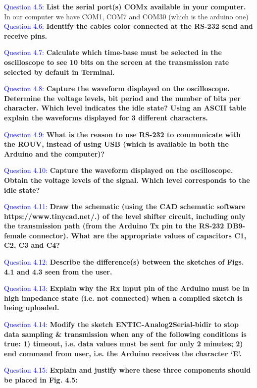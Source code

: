 \documentclass[12pt, a4papre]{article}
\begin{document}
	\textcolor{blue}{Question 4.5:}  \textbf{List the serial port(s) COMx available in your computer. }
		In our computer we have COM1, COM7 and COM30 (which is the arduino one)
	\textcolor{blue}{Question 4.6:}  \textbf{Identify the cables color connected at the RS-232 send and receive pins.}

	\textcolor{blue}{Question 4.7:}  \textbf{Calculate which time-base must be selected in the oscilloscope to see 10 bits on the screen at the transmission rate selected by default in Terminal. }

	\textcolor{blue}{Question 4.8:} \textbf{Capture the waveform displayed on the oscilloscope. Determine the voltage levels, bit period and the number of bits per character. Which level indicates the idle state? Using an ASCII table explain the waveforms displayed for 3 different characters.}

	\textcolor{blue}{Question 4.9:} \textbf{What is the reason to use RS-232 to communicate with the ROUV, instead of using USB (which is available in both the Arduino and the computer)?}

	\textcolor{blue}{Question 4.10:} \textbf{Capture the waveform displayed on the oscilloscope. Obtain the voltage levels of the signal. Which level corresponds to the idle state?}

	\textcolor{blue}{Question 4.11:} \textbf{Draw the schematic (using the CAD schematic software https://www.tinycad.net/.) of the level shifter circuit, including only the transmission path (from the Arduino Tx pin to the RS-232 DB9-female connector). What are the appropriate values of capacitors C1, C2, C3 and C4?}

	\textcolor{blue}{Question 4.12:} \textbf{Describe the difference(s) between the sketches of Figs. 4.1 and 4.3 seen from the user.}

	\textcolor{blue}{Question 4.13:} \textbf{Explain why the Rx input pin of the Arduino must be in high impedance state (i.e. not connected) when a compiled sketch is being uploaded. }

	\textcolor{blue}{Question 4.14:} \textbf{Modify the sketch ENTIC-Analog2Serial-bidir to stop data sampling \& transmission when any of the following conditions is true: 1) timeout, i.e. data values must be sent for only 2 minutes; 2) end command from user, i.e. the Arduino receives the character ‘E’.  }


	\textcolor{blue}{Question 4.15:} \textbf{Explain and justify where these three components should be placed in Fig. 4.5: }
	
\end{document}
